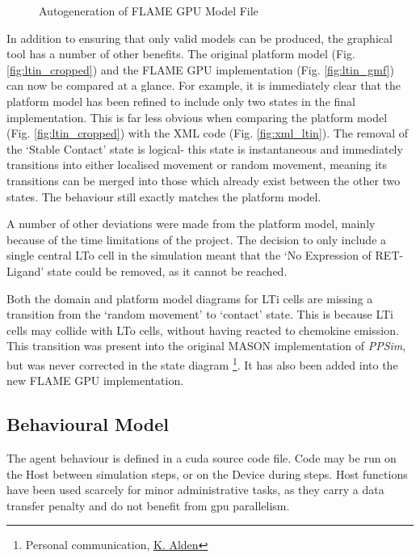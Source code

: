 \documentclass{UoYCSproject}
\begin{document}
\begin{figure}[htp]
\caption{Autogeneration of \gls{FLAME GPU} Model File}
\label{fig:gmf_flame_generation}
\end{figure}
In addition to ensuring that only valid models can be produced, the graphical tool has a number of other benefits.
The original platform model (Fig. \ref{fig:ltin_cropped}) and the \gls{FLAME GPU} implementation (Fig. \ref{fig:ltin_gmf}) can now be compared at a glance.
For example, it is immediately clear that the platform model has been refined to include only two states in the final implementation.
This is far less obvious when comparing the platform model (Fig. \ref{fig:ltin_cropped}) with the XML code (Fig. \ref{fig:xml_ltin}).
The removal of the `Stable Contact' state is logical- this state is instantaneous and immediately transitions into either localised movement or random movement, meaning its transitions can be merged into those which already exist between the other two states.
The behaviour still exactly matches the platform model.

A number of other deviations were made from the platform model, mainly because of the time limitations of the project.
The decision to only include a single central \gls{LTo} cell in the simulation meant that the `No Expression of RET-Ligand' state could be removed, as it cannot be reached.

\label{missing_link}
Both the domain and platform model diagrams for \gls{LTi} cells are missing a transition from the `random movement' to `contact' state.
This is because \gls{LTi} cells may collide with \gls{LTo} cells, without having reacted to chemokine emission.
This transition was present into the original \gls{MASON} implementation of \textit{PPSim}, but was never corrected in the state diagram \footnote{Personal communication, \href{https://www.york.ac.uk/computational-immunology/members/kieran/}{K. Alden}}.
It has also been added into the new \gls{FLAME GPU} implementation.

\subsection{Behavioural Model}
The agent behaviour is defined in a \gls{cuda} source code file.
Code may be run on the \gls{Host} between simulation steps, or on the \gls{Device} during steps.
\gls{Host} functions have been used scarcely for minor administrative tasks, as they carry a data transfer penalty and do not benefit from \gls{gpu} parallelism.
\end{document}
